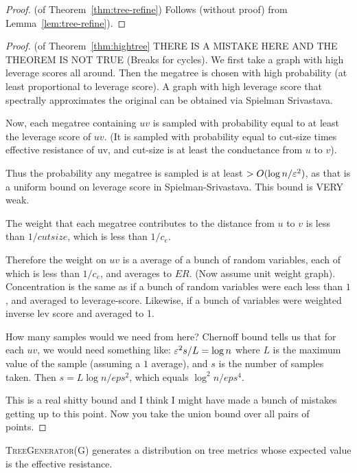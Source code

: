 \begin{proof} (of Theorem~\ref{thm:tree-refine})
  Follows (without proof) from Lemma~\ref{lem:tree-refine}).
\end{proof}
\begin{proof} (of Theorem~\ref{thm:hightree}
  THERE IS A MISTAKE HERE AND THE THEOREM IS NOT TRUE (Breaks for
  cycles).
  We first take a graph with high leverage scores all around. Then the
  megatree is chosen with high probability (at least proportional to leverage
  score).  A graph with high leverage score that spectrally approximates
  the original can be obtained via Spielman Srivastava. 

  Now, each megatree containing $uv$ is sampled with probability equal
  to at least the leverage score of $uv$. (It is sampled with
  probability equal to cut-size times effective resistance of uv, and
  cut-size is at least the conductance from $u$ to $v$).

  Thus the probability any megatree is sampled is at least
  $ > O(\log n/\varepsilon^2)$, as that is a uniform bound on leverage score in
  Spielman-Srivastava. This bound is VERY weak.

  The weight that each megatree contributes to the distance from $u$ to
  $v$ is less than $1 / cut size$, which is less than $1/c_e$.

  Therefore the weight on $uv$ is a average of a bunch of random variables,
  each of which is less than $1/c_e$, and averages to $ER$. (Now assume unit
  weight graph). Concentration is the same as if a bunch of random
  variables were each less than $1$, and averaged to leverage-score.
  Likewise, if a bunch of variables were weighted inverse lev score and
  averaged to 1.

  How many samples would we need from here? Chernoff bound tells us that
  for each $uv$, we would need something like: $\varepsilon^2 s / L = \log n$
  where $L$
  is the maximum value of the sample (assuming a $1$ average), and $s$ is the number of samples
  taken. Then $s = L \log n / eps^2$, which equals $\log^2 n / eps^4$.

  This is a real shitty bound and I think I might have made a bunch of
  mistakes getting up to this point. Now you take the union bound over
  all pairs of points.

\end{proof}
%
\begin{corollary} \textsc{TreeGenerator(G)} generates a distribution on
  tree metrics whose expected value is the effective resistance.
\end{corollary}

